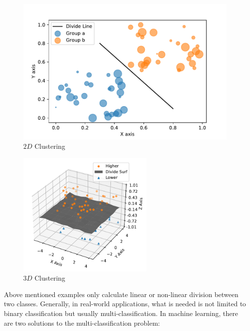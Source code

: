 \begin{spacing}{1.5}
\begin{figure}[ht]
\centering
\includegraphics[width=0.99\textwidth, fbox]{Chapter2/2dcluster.pdf}
\caption{$2D$ Clustering}
\label{fig:2dcluster} 
\end{figure}

% 

\begin{figure}[ht]
\centering
\includegraphics[width=0.6\textwidth, fbox]{Chapter2/3dcluster.pdf}
\caption{$3D$ Clustering}
\label{fig:3dcluster} 
\end{figure}

Above mentioned examples only calculate linear or non-linear division between two classes. Generally, in real-world applications, what is needed is not limited to binary classification but usually multi-classification. In machine learning, there are two solutions to the multi-classification problem: 


\end{spacing}
